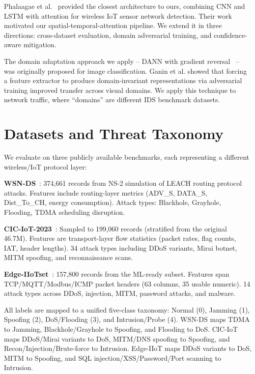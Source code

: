 \documentclass[conference]{IEEEtran}
\begin{document}
Phalaagae et al.~\cite{phalaagae2025hybrid} provided the closest architecture to ours, combining CNN and LSTM with attention for wireless IoT sensor network detection. Their work motivated our spatial-temporal-attention pipeline. We extend it in three directions: cross-dataset evaluation, domain adversarial training, and confidence-aware mitigation.

The domain adaptation approach we apply -- DANN with gradient reversal~\cite{ganin2016domain} -- was originally proposed for image classification. Ganin et al. showed that forcing a feature extractor to produce domain-invariant representations via adversarial training improved transfer across visual domains. We apply this technique to network traffic, where ``domains'' are different IDS benchmark datasets.

\section{Datasets and Threat Taxonomy}

We evaluate on three publicly available benchmarks, each representing a different wireless/IoT protocol layer:

\textbf{WSN-DS}~\cite{almomani2016wsn}: 374,661 records from NS-2 simulation of LEACH routing protocol attacks. Features include routing-layer metrics (ADV\_S, DATA\_S, Dist\_To\_CH, energy consumption). Attack types: Blackhole, Grayhole, Flooding, TDMA scheduling disruption.

\textbf{CIC-IoT-2023}~\cite{neto2023ciciot}: Sampled to 199,060 records (stratified from the original 46.7M). Features are transport-layer flow statistics (packet rates, flag counts, IAT, header lengths). 34 attack types including DDoS variants, Mirai botnet, MITM spoofing, and reconnaissance scans.

\textbf{Edge-IIoTset}~\cite{ferrag2022edge}: 157,800 records from the ML-ready subset. Features span TCP/MQTT/Modbus/ICMP packet headers (63 columns, 35 usable numeric). 14 attack types across DDoS, injection, MITM, password attacks, and malware.

All labels are mapped to a unified five-class taxonomy: Normal (0), Jamming (1), Spoofing (2), DoS/Flooding (3), and Intrusion/Probe (4). WSN-DS maps TDMA to Jamming, Blackhole/Grayhole to Spoofing, and Flooding to DoS. CIC-IoT maps DDoS/Mirai variants to DoS, MITM/DNS spoofing to Spoofing, and Recon/Injection/Brute-force to Intrusion. Edge-IIoT maps DDoS variants to DoS, MITM to Spoofing, and SQL injection/XSS/Password/Port scanning to Intrusion.
\end{document}
